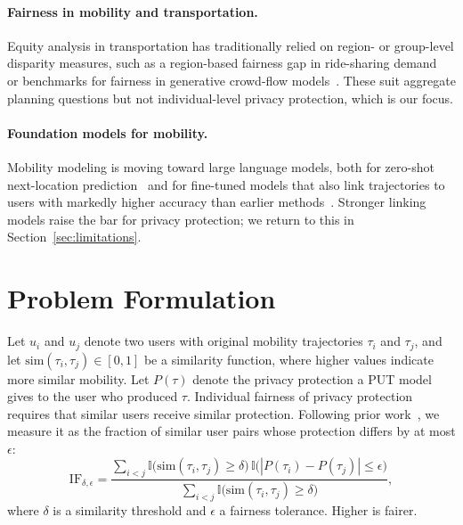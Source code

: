 \documentclass[sigconf,anonymous,review]{acmart}
\begin{document}
\paragraph{Fairness in mobility and transportation.} Equity analysis in transportation has traditionally relied on region- or group-level disparity measures, such as a region-based fairness gap in ride-sharing demand~\cite{yan2019fairst,yan2020fairness} or benchmarks for fairness in generative crowd-flow models~\cite{he2025gcf}. These suit aggregate planning questions but not individual-level privacy protection, which is our focus.

\paragraph{Foundation models for mobility.} Mobility modeling is moving toward large language models, both for zero-shot next-location prediction~\cite{feng2025agentmove} and for fine-tuned models that also link trajectories to users with markedly higher accuracy than earlier methods~\cite{gong2024mobilityllm}. Stronger linking models raise the bar for privacy protection; we return to this in Section~\ref{sec:limitations}.

\section{Problem Formulation}
\label{sec:problem}
Let $u_i$ and $u_j$ denote two users with original mobility trajectories $\tau_i$ and $\tau_j$, and let $\mathrm{sim}(\tau_i,\tau_j)\in[0,1]$ be a similarity function, where higher values indicate more similar mobility. Let $P(\tau)$ denote the privacy protection a PUT model gives to the user who produced $\tau$. Individual fairness of privacy protection requires that similar users receive similar protection. Following prior work~\cite{zhan2023fairness}, we measure it as the fraction of similar user pairs whose protection differs by at most $\epsilon$:
\begin{equation}
\mathrm{IF}_{\delta,\epsilon} = \frac{\sum_{i<j} \mathbb{I}\big(\mathrm{sim}(\tau_i,\tau_j)\ge\delta\big)\,\mathbb{I}\big(|P(\tau_i)-P(\tau_j)|\le\epsilon\big)}{\sum_{i<j} \mathbb{I}\big(\mathrm{sim}(\tau_i,\tau_j)\ge\delta\big)},
\label{eq:if}
\end{equation}
where $\delta$ is a similarity threshold and $\epsilon$ a fairness tolerance. Higher is fairer.
\end{document}
